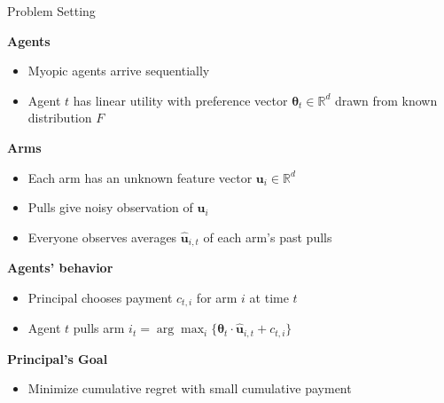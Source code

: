 \documentclass[serif]{beamer}
\begin{document}
\begin{frame}{Problem Setting}

\textbf{Agents}
\begin{itemize}
\item Myopic agents arrive sequentially
\item Agent $t$ has linear utility with preference vector $\bm{\theta}_t\in \mathbb{R}^{d}$ drawn from known distribution $F$
\end{itemize}
\vspace{0.5cm}

\textbf{Arms}
\begin{itemize}
\item Each arm has an unknown feature vector $\bm{u}_i\in \mathbb{R}^{d}$
\item Pulls give noisy observation of $\bm{u}_i$ 
\item Everyone observes averages $\hat{\bm{u}}_{i,t}$ of each arm's past pulls
\end{itemize}

\vspace{0.5cm}
\textbf{Agents' behavior}
\begin{itemize}
\item Principal chooses payment $c_{t,i}$ for arm $i$ at time $t$
\item Agent $t$ pulls arm $i_t = \arg\max_{i}\{\bm{\theta}_{t}\cdot \hat{\bm{u}}_{i,t}+c_{t,i}\}$
\end{itemize}



\vspace{0.5cm}

\textbf{Principal's Goal}
\begin{itemize}
\item Minimize cumulative regret with small cumulative payment
\end{itemize}

\end{frame}

\end{document}
